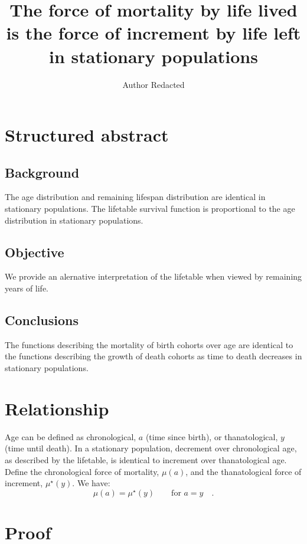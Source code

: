 \documentclass{article}
\begin{document}
\title{The force of mortality by life lived is the force of increment by life
left in stationary populations}
\author{Author Redacted}
\maketitle
\section*{Structured abstract}

\subsection*{Background}
The age distribution and remaining lifespan distribution are identical in
stationary populations. The lifetable survival function is proportional to the
age distribution in stationary populations.

\subsection*{Objective}
We provide an alernative interpretation of the lifetable when viewed by
remaining years of life.

\subsection*{Conclusions}
The functions describing the mortality of birth cohorts over age are identical
to the functions describing the growth of death cohorts as time to death decreases in stationary populations.
\vspace{2cm}
\section*{Relationship}

Age can be defined as chronological, $a$ (time since birth), or thanatological,
$y$ (time until death). In a stationary population, decrement over
chronological age, as described by the lifetable, is
identical to increment over thanatological age. Define the chronological force
of mortality, $\mu(a)$, and the thanatological force of increment,
$\mu^\star(y)$. We have:
\begin{equation}
\mu(a) = \mu^\star(y)\quad\quad\text{for~}a=y\quad \text{.}
\end{equation}

\section*{Proof}
\end{document}
